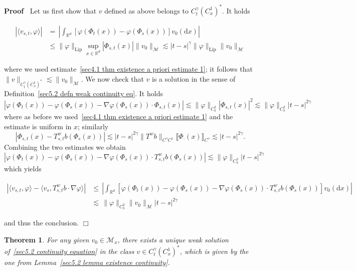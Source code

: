 \documentclass[10pt]{article}
\newcommand{\mathd}{\mathrm{d}}
\newcommand{\tmop}[1]{\ensuremath{\operatorname{#1}}}
\newenvironment{proof}{\noindent\textbf{Proof\ }}{\hspace*{\fill}$\Box$\medskip}
\newtheorem{theorem}{Theorem}
\begin{document}
\begin{proof}
  Let us first show that $v$ defined as above belongs to $C^{\gamma}_t
  (C^1_x)^{\ast}$. It holds
  
  \begin{align*}
    | \langle v_{s, t}, \varphi \rangle | & = \, \left| \int_{\mathbb{R}^d}
    [\varphi (\Phi_t (x)) - \varphi (\Phi_s (x))] v_0 (\mathd x) \right|\\
    & \leqslant \| \varphi \|_{\tmop{Lip}} \sup_{x \in \mathbb{R}^d} |
    \Phi_{s, t} (x) |  \| v_0 \|_{\mathcal{M}} \lesssim | t - s |^{\gamma} \|
    \varphi \|_{\tmop{Lip}} \| v_0 \|_{\mathcal{M}}
  \end{align*}
  
  where we used estimate~{\eqref{sec4.1 thm existence a priori estimate 1}};
  it follows that $\| v \|_{C^{\gamma}_t (C^1_x)^{\ast}} \lesssim \| v_0
  \|_{\mathcal{M}}$. We now check that $v$ is a solution in the sense of
  Definition~\ref{sec5.2 defn weak continuity eq}. It holds
  \[ | \varphi (\Phi_t (x)) - \varphi (\Phi_s (x)) - \nabla \varphi (\Phi_s
     (x)) \cdot \Phi_{s, t} (x) | \lesssim \| \varphi \|_{C^2_b}  | \Phi_{s,
     t} (x) |^2 \lesssim \| \varphi \|_{C^2_b}  | t - s |^{2 \gamma} \]
  where as before we used~{\eqref{sec4.1 thm existence a priori estimate 1}}
  and the estimate is uniform in $x$; similarly
  \[ | \Phi_{s, t} (x) - T^w_{s, t} b (\Phi_s (x)) | \lesssim | t - s |^{2
     \gamma} \| T^w b \|_{C^{\gamma} C^1} \llbracket \Phi_{\cdot} (x)
     \rrbracket_{C^{\gamma}} \lesssim | t - s |^{2 \gamma} . \]
  Combining the two estimates we obtain
  \[ | \varphi (\Phi_t (x)) - \varphi (\Phi_s (x)) - \nabla \varphi (\Phi_s
     (x)) \cdot T^w_{s, t} b (\Phi_s (x)) | \lesssim \| \varphi \|_{C^2_b} | t
     - s |^{2 \gamma} \]
  which yields
  
  \begin{align*}
    | \langle v_{s, t}, \varphi \rangle - \langle v_s, T^w_{s, t} b \cdot
    \nabla \varphi \rangle | & \leqslant \, \left| \int_{\mathbb{R}^d}
    [\varphi (\Phi_t (x)) - \varphi (\Phi_s (x)) - \nabla \varphi (\Phi_s (x))
    \cdot T^w_{s, t} b (\Phi_s (x))] v_0 (\mathd x) \right|\\
    & \lesssim \, \| \varphi \|_{C^2_b}  \| v_0 \|_{\mathcal{M}}  | t - s
    |^{2 \gamma}
  \end{align*}
  
  and thus the conclusion.
\end{proof}

\begin{theorem}
  \label{sec5.2 thm uniqueness continuity}For any given $v_0 \in
  \mathcal{M}_x$, there exists a unique weak solution of~{\eqref{sec5.2
  continuity equation}} in the class $v \in C^{\gamma}_t (C^1_x)^{\ast}$,
  which is given by the one from Lemma~\ref{sec5.2 lemma existence
  continuity}.
\end{theorem}
\end{document}
